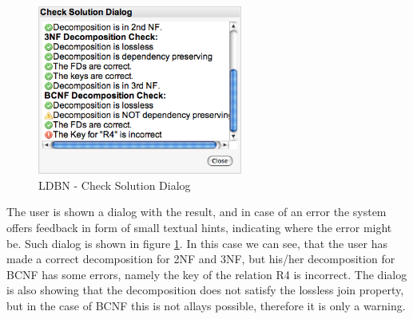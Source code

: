 \begin{figure}[h]
	\begin{center}
		\includegraphics[width=0.6\textwidth]{./img/screen03.png}
		\caption{LDBN - Check Solution Dialog}
		\label{fig:screen03}
	\end{center}
\end{figure}

The user is shown a dialog with the result, and in case of an error the system offers
feedback in form of small textual hints, indicating
where the error might be. Such dialog is shown in figure \ref{fig:screen03}. In this case
we can see, that the user has made a correct decomposition for 2NF and 3NF,
but his/her decomposition for BCNF has some errors, namely the key of the relation R4 is
incorrect. The dialog is also showing that the decomposition does not 
satisfy the lossless join property, but in the case of BCNF this
is not allays possible, therefore it is only a warning. 

